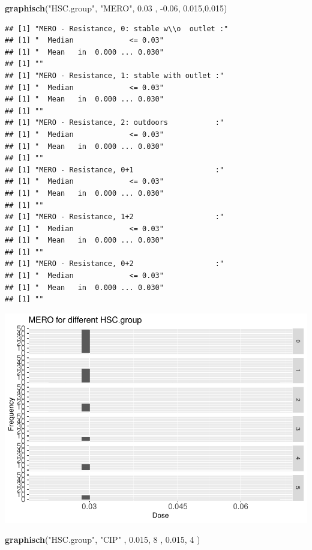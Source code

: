 \documentclass[
]{article}
\newenvironment{Shaded}{\begin{snugshade}}{\end{snugshade}}
\newcommand{\DecValTok}[1]{\textcolor[rgb]{0.00,0.00,0.81}{#1}}
\newcommand{\FloatTok}[1]{\textcolor[rgb]{0.00,0.00,0.81}{#1}}
\newcommand{\KeywordTok}[1]{\textcolor[rgb]{0.13,0.29,0.53}{\textbf{#1}}}
\newcommand{\NormalTok}[1]{#1}
\newcommand{\StringTok}[1]{\textcolor[rgb]{0.31,0.60,0.02}{#1}}
\begin{document}
\begin{Shaded}
\begin{Highlighting}[]
  \KeywordTok{graphisch}\NormalTok{(}\StringTok{"HSC.group"}\NormalTok{, }\StringTok{"MERO"}\NormalTok{, }\FloatTok{0.03}\NormalTok{ ,  }\FloatTok{-0.06}\NormalTok{,   }\FloatTok{0.015}\NormalTok{,}\FloatTok{0.015}\NormalTok{)}
\end{Highlighting}
\end{Shaded}

\begin{verbatim}
## [1] "MERO - Resistance, 0: stable w\\o  outlet :"
## [1] "  Median             <= 0.03"
## [1] "  Mean   in  0.000 ... 0.030"
## [1] ""
## [1] "MERO - Resistance, 1: stable with outlet :"
## [1] "  Median             <= 0.03"
## [1] "  Mean   in  0.000 ... 0.030"
## [1] ""
## [1] "MERO - Resistance, 2: outdoors           :"
## [1] "  Median             <= 0.03"
## [1] "  Mean   in  0.000 ... 0.030"
## [1] ""
## [1] "MERO - Resistance, 0+1                   :"
## [1] "  Median             <= 0.03"
## [1] "  Mean   in  0.000 ... 0.030"
## [1] ""
## [1] "MERO - Resistance, 1+2                   :"
## [1] "  Median             <= 0.03"
## [1] "  Mean   in  0.000 ... 0.030"
## [1] ""
## [1] "MERO - Resistance, 0+2                   :"
## [1] "  Median             <= 0.03"
## [1] "  Mean   in  0.000 ... 0.030"
## [1] ""
\end{verbatim}

\includegraphics{Verteilungen_files/figure-latex/unnamed-chunk-45-1.pdf}

\begin{Shaded}
\begin{Highlighting}[]
  \KeywordTok{graphisch}\NormalTok{(}\StringTok{"HSC.group"}\NormalTok{, }\StringTok{"CIP"}\NormalTok{ , }\FloatTok{0.015}\NormalTok{,   }\DecValTok{8}\NormalTok{   ,   }\FloatTok{0.015}\NormalTok{,   }\DecValTok{4}\NormalTok{    ) }
\end{Highlighting}
\end{Shaded}
\end{document}
